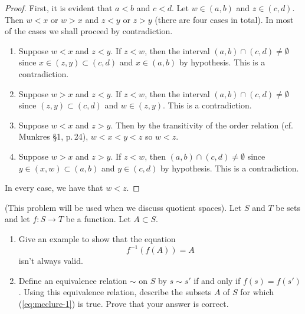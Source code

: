\begin{proof}
First, it is evident that $a<b$ and $c<d$. Let $w\in(a,b)$ and
$z\in(c,d)$. Then $w<x$ or $w>x$ and $z<y$ or $z>y$ (there are
four cases in total). In most of the cases we shall proceed by
contradiction.
\begin{enumerate}[label=Case \arabic*:]
\item Suppose $w<x$ and $z<y$. If $z<w$, then the interval
  $(a,b)\cap (c,d)\neq\emptyset$ since $x\in (z,y)\subset (c,d)$ and
  $x\in (a,b)$ by hypothesis. This is a contradiction.
\item Suppose $w>x$ and $z<y$. If $z<w$, then the interval
  $(a,b)\cap (c,d)\neq\emptyset$ since $(z,y)\subset (c,d)$ and
  $w\in (z,y)$. This is a contradiction.
\item Suppose $w<x$ and $z>y$. Then by the transitivity of the
  order relation (cf.\,Munkres \S1, p.\,24), $w<x<y<z$ so
  $w<z$.
\item Suppose $w>x$ and $z>y$. If $z<w$, then
  $(a,b)\cap(c,d)\neq\emptyset$  since $y\in (x,w)\subset (a,b)$
  and $y\in(c,d)$ by hypothesis. This is a contradiction.
\end{enumerate}
In every case, we have that $w<z$.
\end{proof}
\newpage
\begin{problem}[C]
(This problem will be used when we discuss quotient spaces). Let
$S$ and $T$ be sets and let $f\colon S\to T$ be a function. Let
$A\subset S$.
\begin{enumerate}[noitemsep,label=(\roman*)]
\item Give an example to show that the equation
\begin{equation}
\label{eq:mcclure-1}
\tag{*}
f^{-1}(f(A))=A
\end{equation}
isn't always valid.
\item Define an equivalence relation $\sim$ on $S$ by $s\sim s'$
  if and only if $f(s)=f(s')$. Using this equivalence relation,
  describe the subsets $A$ of $S$ for which (\ref{eq:mcclure-1}) is
  true. Prove that your answer is correct.
\end{enumerate}
\end{problem}
